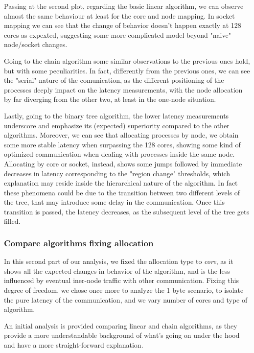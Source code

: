 \documentclass{article}
\begin{document}
	Passing at the second plot, regarding the basic linear algorithm, we can observe almost the same behaviour at least for the core and node mapping. In socket mapping we can see that the change of behavior doesn't happen exactly at 128 cores as expexted, suggesting some more complicated model beyond "naive" node/socket changes.
	
	Going to the chain algorithm some similar observations to the previous ones hold, but with some peculiarities.
	In fact, differently from the previous ones, we can see the "serial" nature of the comunication, as the different positioning of the processes deeply impact on the latency measurements, with the node allocation by far diverging from the other two, at least in the one-node situation.
	
	Lastly, going to the binary tree algorithm, the lower latency measurements underscore and emphasize its (expected) superiority compared to the other algorithms. Moreover, we can see that allocating processes by node, we obtain some more stable latency when surpassing the 128 cores, showing some kind of optimized communication when dealing with processes inside the same node.
	Allocating by core or socket, instead, shows some jumps followed by immediate decreases in latency corresponding to the "region change" thresholds, which explanation may reside inside the hierarchical nature of the algorithm. In fact these phenomena could be due to the transition between two different levels of the tree, that may introduce some delay in the communication. Once this transition is passed, the latency decreases, as the subsequent level of the tree gets filled.
	
	\subsubsection{Compare algorithms fixing allocation}
	
	In this second part of our analysis, we fixed the allocation type to \textit{core}, as it shows all the expected changes in behavior of the algorithm, and is the less influenced by eventual iner-node traffic with other communication. Fixing this degree of freedom, we chose once more to analyze the 1 byte scenario, to isolate the pure latency of the communication, and we vary number of cores and type of algorithm.
	
	An initial analysis is provided comparing linear and chain algorithms, as they provide a more understandable background of what's going on under the hood and have a more straight-forward explanation.
	
\end{document}
